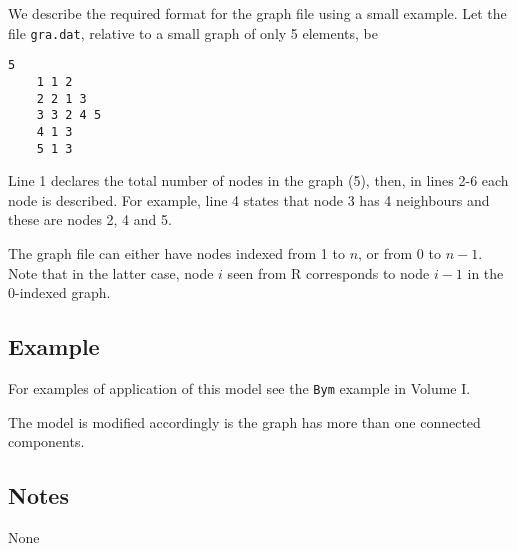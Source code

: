 \documentclass[a4paper,11pt]{article}
\begin{document}
We describe the required format for the graph file using a small
example. Let the file {\tt gra.dat}, relative to a small graph of only
5 elements, be
\begin{lstlisting}[basicstyle=\footnotesize]
    5
    1 1 2
    2 2 1 3
    3 3 2 4 5 
    4 1 3
    5 1 3
\end{lstlisting}
Line 1 declares the total number of nodes in the graph (5), then, in
lines 2-6 each node is described. For example, line 4 states that node
3 has 4 neighbours and these are nodes 2, 4 and 5.

The graph file can either have nodes indexed from 1 to $n$, or from 0
to $n-1$.  Note that in the latter case, node $i$ seen from R
corresponds to node $i-1$ in the 0-indexed graph.

\subsection*{Example}

For examples of application of this model see the {\tt Bym} example in
Volume I.

The model is modified accordingly is the graph has more than one
connected components.

\subsection*{Notes}

None
\end{document}
